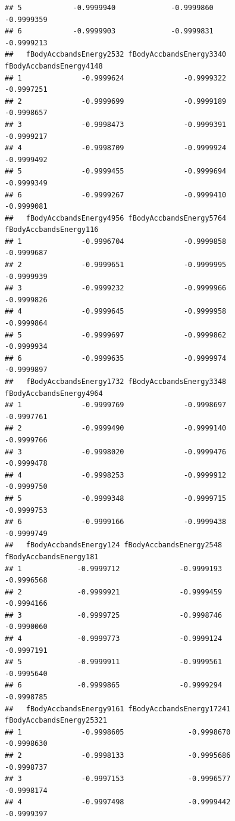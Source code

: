 \documentclass[
]{article}
\begin{document}
\begin{verbatim}
## 5            -0.9999940             -0.9999860              -0.9999359
## 6            -0.9999903             -0.9999831              -0.9999213
##   fBodyAccbandsEnergy2532 fBodyAccbandsEnergy3340 fBodyAccbandsEnergy4148
## 1              -0.9999624              -0.9999322              -0.9997251
## 2              -0.9999699              -0.9999189              -0.9998657
## 3              -0.9998473              -0.9999391              -0.9999217
## 4              -0.9998709              -0.9999924              -0.9999492
## 5              -0.9999455              -0.9999694              -0.9999349
## 6              -0.9999267              -0.9999410              -0.9999081
##   fBodyAccbandsEnergy4956 fBodyAccbandsEnergy5764 fBodyAccbandsEnergy116
## 1              -0.9996704              -0.9999858             -0.9999687
## 2              -0.9999651              -0.9999995             -0.9999939
## 3              -0.9999232              -0.9999966             -0.9999826
## 4              -0.9999645              -0.9999958             -0.9999864
## 5              -0.9999697              -0.9999862             -0.9999934
## 6              -0.9999635              -0.9999974             -0.9999897
##   fBodyAccbandsEnergy1732 fBodyAccbandsEnergy3348 fBodyAccbandsEnergy4964
## 1              -0.9999769              -0.9998697              -0.9997761
## 2              -0.9999490              -0.9999140              -0.9999766
## 3              -0.9998020              -0.9999476              -0.9999478
## 4              -0.9998253              -0.9999912              -0.9999750
## 5              -0.9999348              -0.9999715              -0.9999753
## 6              -0.9999166              -0.9999438              -0.9999749
##   fBodyAccbandsEnergy124 fBodyAccbandsEnergy2548 fBodyAccbandsEnergy181
## 1             -0.9999712              -0.9999193             -0.9996568
## 2             -0.9999921              -0.9999459             -0.9994166
## 3             -0.9999725              -0.9998746             -0.9990060
## 4             -0.9999773              -0.9999124             -0.9997191
## 5             -0.9999911              -0.9999561             -0.9995640
## 6             -0.9999865              -0.9999294             -0.9998785
##   fBodyAccbandsEnergy9161 fBodyAccbandsEnergy17241 fBodyAccbandsEnergy25321
## 1              -0.9998605               -0.9998670               -0.9998630
## 2              -0.9998133               -0.9995686               -0.9998737
## 3              -0.9997153               -0.9996577               -0.9998174
## 4              -0.9997498               -0.9999442               -0.9999397

\end{verbatim}
\end{document}
